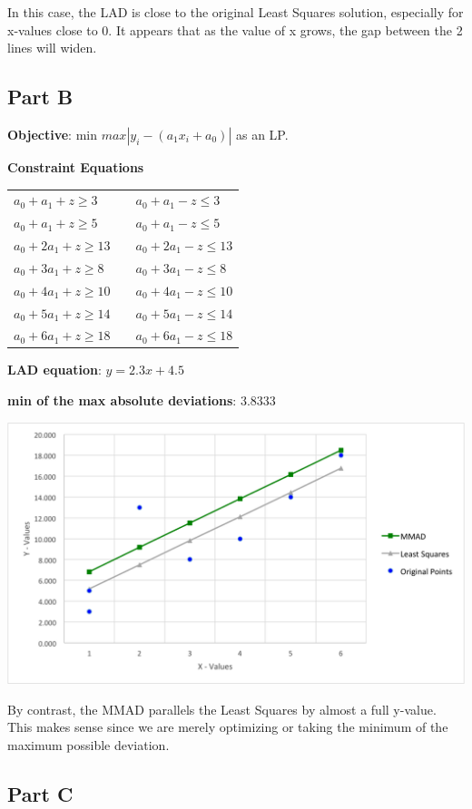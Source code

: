 \documentclass[11pt,letterpaper]{article}
\begin{document}
In this case, the LAD is close to the original Least Squares solution, especially for x-values close to 0. It appears that as the value of x grows, the gap between the 2 lines will widen.

\subsection*{Part B}
\textbf{Objective}: min $max |y_i -  (a_1x_i + a_0)|$ as an LP.\vspace{8pt}

\textbf{Constraint Equations}

\begin{tabular}{l l l}
$a_0+a_1+z\geq3$		&  & $a_0+a_1-z\leq3$\\
$a_0+a_1+z\geq5$ 		& & $a_0+a_1-z\leq5$\\
$a_0+2a_1+z\geq13$	& & $a_0+2a_1-z\leq13$\\
$a_0+3a_1+z\geq8$		& & $a_0+3a_1-z\leq8$\\
$a_0+4a_1+z\geq10$	& & $a_0+4a_1-z\leq10$\\
$a_0+5a_1+z\geq14$	& & $a_0+5a_1-z\leq14$\\
$a_0+6a_1+z\geq18$	& & $a_0+6a_1-z\leq18$\\
\end{tabular}\vspace{8pt}

\textbf{LAD equation}: $y = 2.3x + 4.5$\vspace{8pt}

\textbf{min of the max absolute deviations}: 3.8333\vspace{8pt}

\centerline{\includegraphics[width=7in]{mmad.png}}

By contrast, the MMAD parallels the Least Squares by almost a full y-value. This makes sense since we are merely optimizing or taking the minimum of the maximum possible deviation.\vspace{8pt}



\subsection*{Part C}
\end{document}
